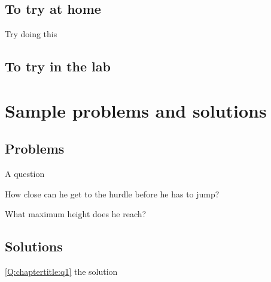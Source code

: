 \subsection{To try at home}

\begin{tQuestion}Try doing this \end{tQuestion}

\subsection{To try in the lab}

\newpage
\section{Sample problems and solutions}
\subsection{Problems}
\begin{problemParts}{A question\label{Q:chaptertitle:q1}}
\item How close can he get to the hurdle before he has to jump?
\item What maximum height does he reach?
\end{problemParts}

\newpage
\subsection{Solutions}
\begin{solution}{\ref{Q:chaptertitle:q1}}
{
the solution
}
\end{solution}

